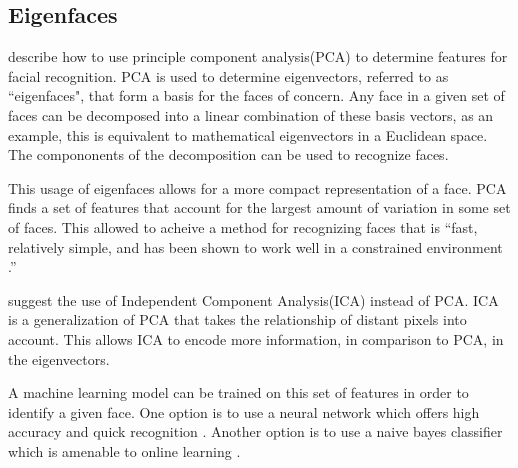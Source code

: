 \subsection{Eigenfaces}
  \citeauthor{eigenFacesRecog} \cite{eigenFacesRecog} describe how to use principle component analysis(PCA) to determine features for facial recognition.
  PCA is used to determine eigenvectors, referred to as ``eigenfaces", that form a basis for the faces of concern.
  Any face in a given set of faces can be decomposed into a linear combination of these basis vectors, as an example, this is equivalent to mathematical eigenvectors in a Euclidean space.
  The compononents of the decomposition can be used to recognize faces.
  
  This usage of eigenfaces allows for a more compact representation of a face.
  PCA finds a set of features that account for the largest amount of variation in some set of faces.
  This allowed \citeauthor{eigenFacesRecog} to acheive a method for recognizing faces that is ``fast, relatively simple, and has been shown to work well in a constrained environment \cite{eigenFacesRecog}.'' 

  \citeauthor{ICAFaceRecog} \cite{ICAFaceRecog} suggest the use of Independent Component Analysis(ICA) instead of PCA.
  ICA is a generalization of PCA that takes the relationship of distant pixels into account.
  This allows ICA to encode more information, in comparison to PCA, in the eigenvectors.

  A machine learning model can be trained on this set of features in order to identify a given face.
  One option is to use a neural network which offers high accuracy and quick recognition \cite{eigenFacesRecog, ICAFaceRecog}.
  Another option is to use a naive bayes classifier which is amenable to online learning \cite{murphy2012}.
